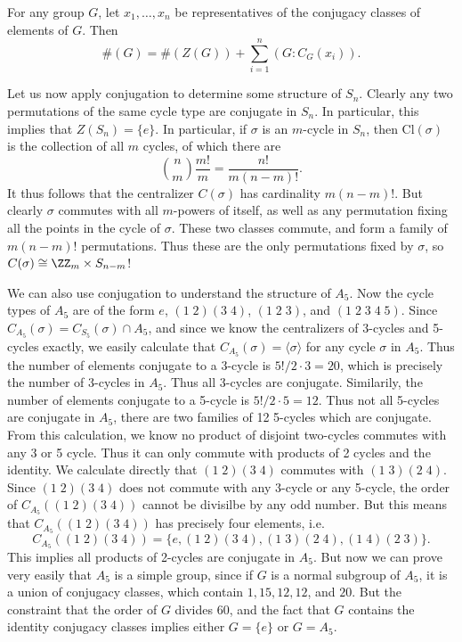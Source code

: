 \begin{corollary} 
    For any group $G$, let $x_1,\dots,x_n$ be representatives of the conjugacy classes of elements of $G$. Then
    \[ \#(G) = \#(Z(G)) + \sum_{i = 1}^n (G:C_G(x_i)). \]
\end{corollary}

\begin{example}
    Let us now apply conjugation to determine some structure of $S_n$. Clearly any two permutations of the same cycle type are conjugate in $S_n$. In particular, this implies that $Z(S_n) = \{ e \}$. In particular, if $\sigma$ is an $m$-cycle in $S_n$, then $\text{Cl}(\sigma)$ is the collection of all $m$ cycles, of which there are
    \[ {{n} \choose {m}} \frac{m!}{m} = \frac{n!}{m (n-m)!}. \]
    It thus follows that the centralizer $C(\sigma)$ has cardinality $m (n-m)!$. But clearly $\sigma$ commutes with all $m$-powers of itself, as well as any permutation fixing all the points in the cycle of $\sigma$. These two classes commute, and form a family of $m (n-m)!$ permutations. Thus these are the only permutations fixed by $\sigma$, so $C(\sigma) \cong \ZZ_m \times S_{n-m}$!
\end{example}

\begin{example}
    We can also use conjugation to understand the structure of $A_5$. Now the cycle types of $A_5$ are of the form $e$, $(1\; 2)(3\; 4)$, $(1\; 2\; 3)$, and $(1\; 2\; 3\; 4\; 5)$. Since $C_{A_5}(\sigma) = C_{S_5}(\sigma) \cap A_5$, and since we know the centralizers of 3-cycles and 5-cycles exactly, we easily calculate that $C_{A_5}(\sigma) = \langle \sigma \rangle$ for any cycle $\sigma$ in $A_5$. Thus the number of elements conjugate to a 3-cycle is $5!/2 \cdot 3 = 20$, which is precisely the number of 3-cycles in $A_5$. Thus all 3-cycles are conjugate. Similarily, the number of elements conjugate to a 5-cycle is $5!/2 \cdot 5 = 12$. Thus not all 5-cycles are conjugate in $A_5$, there are two families of 12 5-cycles which are conjugate. From this calculation, we know no product of disjoint two-cycles commutes with any 3 or 5 cycle. Thus it can only commute with products of 2 cycles and the identity. We calculate directly that $(1\; 2)(3\; 4)$ commutes with $(1\; 3)(2\; 4)$. Since $(1\; 2)(3\; 4)$ does not commute with any 3-cycle or any 5-cycle, the order of $C_{A_5}((1\; 2)(3\; 4))$ cannot be divisilbe by any odd number. But this means that $C_{A_5}((1\; 2)(3\; 4))$ has precisely four elements, i.e.
    \[ C_{A_5}((1\; 2)(3\; 4)) = \{ e, (1\; 2)(3\; 4), (1\; 3)(2\; 4), (1\; 4)(2\; 3) \}. \]
    This implies all products of 2-cycles are conjugate in $A_5$. But now we can prove very easily that $A_5$ is a simple group, since if $G$ is a normal subgroup of $A_5$, it is a union of conjugacy classes, which contain $1,15, 12, 12$, and $20$. But the constraint that the order of $G$ divides 60, and the fact that $G$ contains the identity conjugacy classes implies either $G = \{ e \}$ or $G = A_5$.
\end{example}

